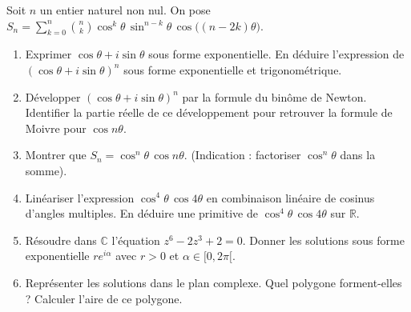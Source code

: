 \documentclass[11pt]{article}
\begin{document}
\begin{exercice}
Soit $n$ un entier naturel non nul. On pose $S_n = \sum_{k=0}^{n} \binom{n}{k} \cos^k \theta \, \sin^{n-k} \theta \, \cos\big((n-2k)\theta\big)$.
\begin{enumerate}
    \item Exprimer $\cos \theta + i \sin \theta$ sous forme exponentielle. En déduire l'expression de $(\cos \theta + i \sin \theta)^n$ sous forme exponentielle et trigonométrique.
    \item Développer $(\cos \theta + i \sin \theta)^n$ par la formule du binôme de Newton. Identifier la partie réelle de ce développement pour retrouver la formule de Moivre pour $\cos n\theta$.
    \item Montrer que $S_n = \cos^n \theta \, \cos n\theta$. (Indication : factoriser $\cos^n \theta$ dans la somme).
    \item Linéariser l'expression $\cos^4 \theta \, \cos 4\theta$ en combinaison linéaire de cosinus d'angles multiples. En déduire une primitive de $\cos^4 \theta \, \cos 4\theta$ sur $\mathbb{R}$.
    \item Résoudre dans $\mathbb{C}$ l'équation $z^6 - 2z^3 + 2 = 0$. Donner les solutions sous forme exponentielle $r e^{i\alpha}$ avec $r>0$ et $\alpha \in [0, 2\pi[$.
    \item Représenter les solutions dans le plan complexe. Quel polygone forment-elles ? Calculer l'aire de ce polygone.
\end{enumerate}
\end{exercice}
\end{document}
